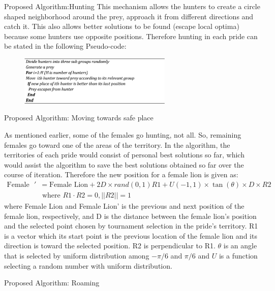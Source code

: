 \documentclass{beamer}
\begin{document}
\begin{frame}{Proposed Algorithm:Hunting}
This mechanism allows the hunters to create a circle shaped neighborhood around the prey, approach it from different directions and catch it. This also allows better solutions to be found (escape local optima) because some hunters use opposite positions.
Therefore hunting in each pride can be stated in the following Pseudo-code:
\begin{figure}[h]
\begin{center}
\includegraphics[width=0.65\textwidth]{img/pa/hunting_pseudo}
\end{center}
\end{figure}
\end{frame}

\begin{frame}{Proposed Algorithm: Moving towards safe place}

As mentioned earlier, some of the females go hunting, not all. So, remaining females go toward one of the areas of the territory. In the algorithm, the territories of each pride would consist of personal best solutions so far, which would assist the algorithm to save the best solutions obtained so far over the course of iteration.
Therefore the new position for a female lion is given as:
\begin{align*}
\text{Female Lion}' &= \text{Female Lion} + 2D \times rand(0,1){R1} + U(-1,1) \times \tan(\theta) \times D \times {R2} \\
&\text{  where } R1 \cdot R2 = 0, ||R2|| = 1
\end{align*}
where Female Lion and Female Lion' is the previous and next position of the female lion, respectively, and D is the distance between the female lion's position and the selected point chosen by tournament selection in the pride's territory.
{R1} is a vector which its start point is the previous location of the female lion and its direction is toward the selected position. {R2} is perpendicular to {R1}. $\theta$ is an angle that is selected by uniform distribution among $-\pi/6$ and $\pi/6$ and $U$ is a function selecting a random number with uniform distribution.
\end{frame}

\begin{frame}{Proposed Algorithm: Roaming}
\end{frame}
\end{document}
